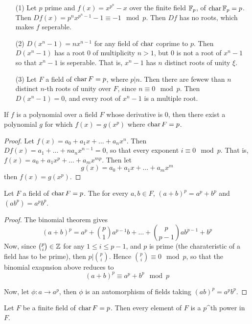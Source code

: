 \begin{example}\label{example_8.15}
  \begin{enumerate}
    \item[(1)] Let $p$ prime and $f(x)=x^{p^n}-x$ over the finite field
      $\mathbb{F}_p$, of $\operatorname{char}{\mathbb{F}_p}=p$. Then $D{f}(x)=p^nx^{p^n-1}-1 \equiv -1
      \mod{p}$. Then $D{f}$ has no roots, which makes $f$ seperable.

    \item[(2)] $D{(x^n-1)}=nx^{n-1}$ for any field of $\operatorname{char}$ coprime to
      $p$. Then  $D{(x^n-1)}$ has a root $0$ of multiplicity  $n>1$, but
      $0$ is not a root of  $x^n-1$ so that  $x^n-1$ is seperable. That
      is,  $x^n-1$ has  $n$ distinct roots of unity  $\xi$.

    \item[(3)] Let $F$ a field of  $\operatorname{char}{F}=p$, where $p|n$. Then there are
      fewew than $n$ distinct  $n$-th roots of unity over $F$, since $n
      \equiv 0 \mod{p}$. Then $D{(x^n-1)}=0$, and every root of $x^n-1$ is
      a multiple root.
  \end{enumerate}
\end{example}

\begin{lemma}\label{lemma_8.6.5}
  If $f$ is a polynomial over a field $F$ whose derivative is  $0$, then there
  exist a polynomial  $g$ for which $f(x)=g(x^p)$ where $\operatorname{char}{F}=p$.
\end{lemma}
\begin{proof}
  Let $f(x)=a_0+a_1x+\dots+a_nx^n$. Then $D{f}(x)=a_1+\dots+na_nx^{n-1}=0$, so
  that every exponent $i \equiv 0 \mod{p}$. That is,
  $f(x)=a_0+a_1x^p+\dots+a_mx^{mp}$. Then let
  \begin{equation*}
    g(x)=a_0+a_1x+\dots+a_mx^m
  \end{equation*}
  then $f(x)=g(x^p)$.
\end{proof}

\begin{lemma}\label{lemma_8.6.6}
  Let $F$ a field of  $\operatorname{char}{F}=p$. The for every $a,b \in F$,
  $(a+b)^p=a^p+b^p$ and $(ab^p)=a^pb^p$.
\end{lemma}
\begin{proof}
  The binomial theorem gives
  \begin{equation*}
    (a+b)^p=a^p+{p \choose 1}a^{p-1}b+\dots+{p \choose p-1}ab^{p-1}+b^p
  \end{equation*}
  Now, since ${p \choose i} \in \mathbb{Z}$ for any $1 \leq i \leq p-1$, and $p$ is
  prime (the charateristic of a field has to be prime), then $p|{p \choose
  i}$. Hence ${p \choose i} \equiv 0 \mod{p}$, so that the binomial exapnsion
  above reduces to
  \begin{equation*}
    (a+b)^p \equiv a^p+b^p \mod{p}
  \end{equation*}

  Now, let $\phi:a \xrightarrow{} a^p$, then $\phi$ is an automorphism of
  fields taking  $(ab)^p=a^pb^p$.
\end{proof}
\begin{corollary}
  Let $F$ be a finite field of  $\operatorname{char}{F}=p$. Then every element of $F$ is a
  $p$^{th} power in $F$.
\end{corollary}

